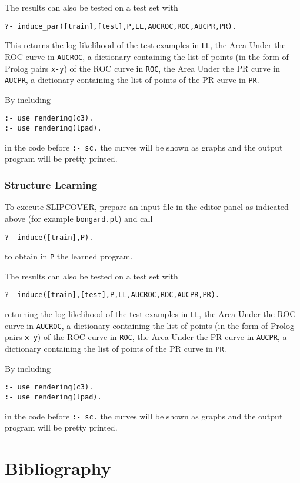 \documentclass[a4paper,10pt]{article}
\begin{document}
The results can also be tested on a test set with
\begin{verbatim}
?- induce_par([train],[test],P,LL,AUCROC,ROC,AUCPR,PR).
\end{verbatim}
This returns the log likelihood of the test examples in \verb|LL|, the Area Under the ROC curve in \verb|AUCROC|, a dictionary containing the list of points (in the form of Prolog pairs \verb|x-y|) of the ROC curve in \verb|ROC|,
the Area Under the PR curve in \verb|AUCPR|, a dictionary containing the list of points of the PR curve in \verb|PR|.

By including
\begin{verbatim}
:- use_rendering(c3).
:- use_rendering(lpad).
\end{verbatim}
in the code before \verb|:- sc.| the curves will be shown as graphs and the output program will be pretty printed.




\subsubsection{Structure Learning}
To execute SLIPCOVER,
prepare an input file in the editor panel as indicated above 
(for example \verb|bongard.pl|)
and call
\begin{verbatim}
?- induce([train],P).
\end{verbatim}
to obtain in \verb|P| the learned program.

The results can also be tested on a test set with
\begin{verbatim}
?- induce([train],[test],P,LL,AUCROC,ROC,AUCPR,PR).
\end{verbatim}
returning the log likelihood of the test examples in \verb|LL|, the Area Under the ROC curve in \verb|AUCROC|, a dictionary containing the list of points (in the form of Prolog pairs \verb|x-y|) of the ROC curve in \verb|ROC|,
the Area Under the PR curve in \verb|AUCPR|, a dictionary containing the list of points of the PR curve in \verb|PR|.

By including
\begin{verbatim}
:- use_rendering(c3).
:- use_rendering(lpad).
\end{verbatim}
in the code before \verb|:- sc.| the curves will be shown as graphs and the output program will be pretty printed.



\section{Bibliography}


\end{document}
